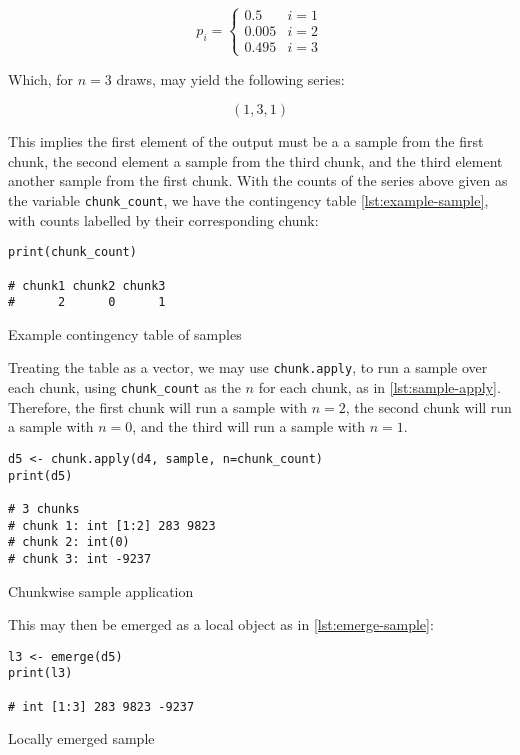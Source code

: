 \begin{equation}\label{eqn:prob-dens}
    p_i = \begin{cases}
        0.5   & i=1 \\
        0.005 & i=2 \\
        0.495 & i=3
    \end{cases}
\end{equation}


Which, for \(n=3\) draws, may yield the following series:

\[
    (1, 3, 1)
\]

This implies the first element of the output must be a a sample from the
first chunk, the second element a sample from the third chunk, and the
third element another sample from the first chunk. With the counts of
the series above given as the variable \texttt{chunk\_count}, we have
the contingency table \cref{lst:example-sample}, with counts labelled by their
corresponding chunk:

\begin{listing}
    \begin{verbatim}
print(chunk_count)

# chunk1 chunk2 chunk3 
#      2      0      1 
    \end{verbatim}
    \caption{Example contingency table of samples}
    \label{lst:example-sample}
\end{listing}

Treating the table as a vector, we may use \texttt{chunk.apply}, to run
a sample over each chunk, using \texttt{chunk\_count} as the \(n\) for
each chunk, as in \cref{lst:sample-apply}. Therefore, the first chunk will run a sample with \(n=2\),
the second chunk will run a sample with \(n=0\), and the third will run
a sample with \(n=1\).

\begin{listing}
    \begin{verbatim}
d5 <- chunk.apply(d4, sample, n=chunk_count)
print(d5)

# 3 chunks
# chunk 1: int [1:2] 283 9823
# chunk 2: int(0)
# chunk 3: int -9237
    \end{verbatim}
    \caption{Chunkwise sample application}
    \label{lst:sample-apply}
\end{listing}

This may then be emerged as a local object as in \cref{lst:emerge-sample}:

\begin{listing}
    \begin{verbatim}
l3 <- emerge(d5)
print(l3)

# int [1:3] 283 9823 -9237
    \end{verbatim}
    \caption{Locally emerged sample}
    \label{lst:emerge-sample}
\end{listing}

